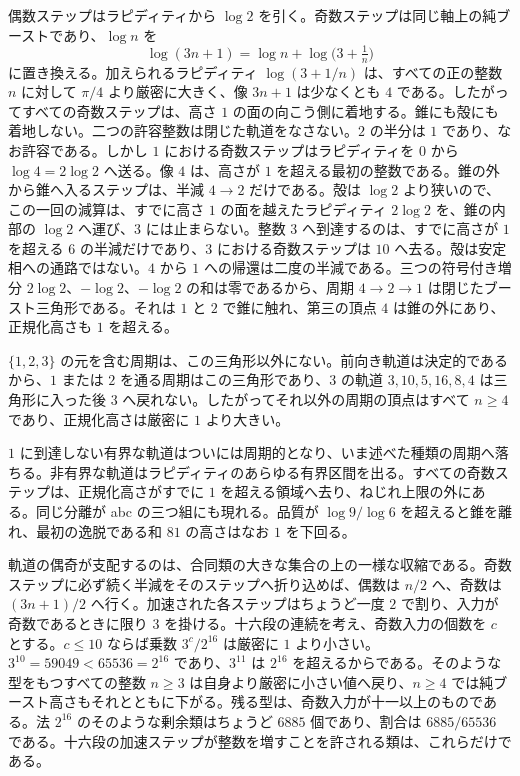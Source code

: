 \documentclass[a4paper]{article}
\theoremstyle{definition}
\theoremstyle{remark}
\begin{document}
偶数ステップはラピディティから \(\log 2\) を引く。奇数ステップは同じ軸上の純ブーストであり、\(\log n\) を
\[
\log(3n+1)=\log n+\log\bigl(3+\tfrac1n\bigr)
\]
に置き換える。加えられるラピディティ \(\log(3+1/n)\) は、すべての正の整数 \(n\) に対して \(\pi/4\) より厳密に大きく、像 \(3n+1\) は少なくとも \(4\) である。したがってすべての奇数ステップは、高さ \(1\) の面の向こう側に着地する。錐にも殻にも着地しない。二つの許容整数は閉じた軌道をなさない。\(2\) の半分は \(1\) であり、なお許容である。しかし \(1\) における奇数ステップはラピディティを \(0\) から \(\log 4=2\log 2\) へ送る。像 \(4\) は、高さが \(1\) を超える最初の整数である。錐の外から錐へ入るステップは、半減 \(4\to 2\) だけである。殻は \(\log 2\) より狭いので、この一回の減算は、すでに高さ \(1\) の面を越えたラピディティ \(2\log 2\) を、錐の内部の \(\log 2\) へ運び、\(3\) には止まらない。整数 \(3\) へ到達するのは、すでに高さが \(1\) を超える \(6\) の半減だけであり、\(3\) における奇数ステップは \(10\) へ去る。殻は安定相への通路ではない。\(4\) から \(1\) への帰還は二度の半減である。三つの符号付き増分 \(2\log 2\)、\(-\log 2\)、\(-\log 2\) の和は零であるから、周期 \(4\to 2\to 1\) は閉じたブースト三角形である。それは \(1\) と \(2\) で錐に触れ、第三の頂点 \(4\) は錐の外にあり、正規化高さも \(1\) を超える。

\(\{1,2,3\}\) の元を含む周期は、この三角形以外にない。前向き軌道は決定的であるから、\(1\) または \(2\) を通る周期はこの三角形であり、\(3\) の軌道 \(3,10,5,16,8,4\) は三角形に入った後 \(3\) へ戻れない。したがってそれ以外の周期の頂点はすべて \(n\ge 4\) であり、正規化高さは厳密に \(1\) より大きい。

\(1\) に到達しない有界な軌道はついには周期的となり、いま述べた種類の周期へ落ちる。非有界な軌道はラピディティのあらゆる有界区間を出る。すべての奇数ステップは、正規化高さがすでに \(1\) を超える領域へ去り、ねじれ上限の外にある。同じ分離が abc の三つ組にも現れる。品質が \(\log 9/\log 6\) を超えると錐を離れ、最初の逸脱である和 \(81\) の高さはなお \(1\) を下回る。

軌道の偶奇が支配するのは、合同類の大きな集合の上の一様な収縮である。奇数ステップに必ず続く半減をそのステップへ折り込めば、偶数は \(n/2\) へ、奇数は \((3n+1)/2\) へ行く。加速された各ステップはちょうど一度 \(2\) で割り、入力が奇数であるときに限り \(3\) を掛ける。十六段の連続を考え、奇数入力の個数を \(c\) とする。\(c\le 10\) ならば乗数 \(3^c/2^{16}\) は厳密に \(1\) より小さい。\(3^{10}=59049<65536=2^{16}\) であり、\(3^{11}\) は \(2^{16}\) を超えるからである。そのような型をもつすべての整数 \(n\ge 3\) は自身より厳密に小さい値へ戻り、\(n\ge 4\) では純ブースト高さもそれとともに下がる。残る型は、奇数入力が十一以上のものである。法 \(2^{16}\) のそのような剰余類はちょうど \(6885\) 個であり、割合は \(6885/65536\) である。十六段の加速ステップが整数を増すことを許される類は、これらだけである。
\end{document}
